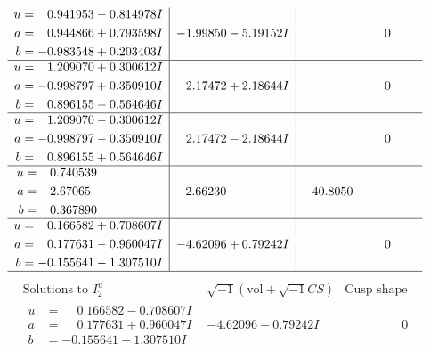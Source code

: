 \documentclass[1p]{elsarticle_modified}
\theoremstyle{definition}
\newcommand{\I}{\sqrt{-1}}
\begin{document}
$$\begin{array}{c|c|c}
\begin{aligned}
u &= \phantom{-}0.941953 - 0.814978 I \\
a &= \phantom{-}0.944866 + 0.793598 I \\
b &= -0.983548 + 0.203403 I\end{aligned}
 & -1.99850 - 5.19152 I & \phantom{-0.000000 } 0 \\ \hline\begin{aligned}
u &= \phantom{-}1.209070 + 0.300612 I \\
a &= -0.998797 + 0.350910 I \\
b &= \phantom{-}0.896155 - 0.564646 I\end{aligned}
 & \phantom{-}2.17472 + 2.18644 I & \phantom{-0.000000 } 0 \\ \hline\begin{aligned}
u &= \phantom{-}1.209070 - 0.300612 I \\
a &= -0.998797 - 0.350910 I \\
b &= \phantom{-}0.896155 + 0.564646 I\end{aligned}
 & \phantom{-}2.17472 - 2.18644 I & \phantom{-0.000000 } 0 \\ \hline\begin{aligned}
u &= \phantom{-}0.740539\phantom{ +0.000000I} \\
a &= -2.67065\phantom{ +0.000000I} \\
b &= \phantom{-}0.367890\phantom{ +0.000000I}\end{aligned}
 & \phantom{-}2.66230\phantom{ +0.000000I} & \phantom{-}40.8050\phantom{ +0.000000I} \\ \hline\begin{aligned}
u &= \phantom{-}0.166582 + 0.708607 I \\
a &= \phantom{-}0.177631 - 0.960047 I \\
b &= -0.155641 - 1.307510 I\end{aligned}
 & -4.62096 + 0.79242 I & \phantom{-0.000000 } 0\\
 \hline 
 \end{array}$$\newpage$$\begin{array}{c|c|c}  
\text{Solutions to }I^u_{2}& \I (\text{vol} + \sqrt{-1}CS) & \text{Cusp shape}\\
 \hline 
\begin{aligned}
u &= \phantom{-}0.166582 - 0.708607 I \\
a &= \phantom{-}0.177631 + 0.960047 I \\
b &= -0.155641 + 1.307510 I\end{aligned}
 & -4.62096 - 0.79242 I & \phantom{-0.000000 } 0 \\ \hline\begin{aligned}

\end{aligned}
\end{array}$$
\end{document}
